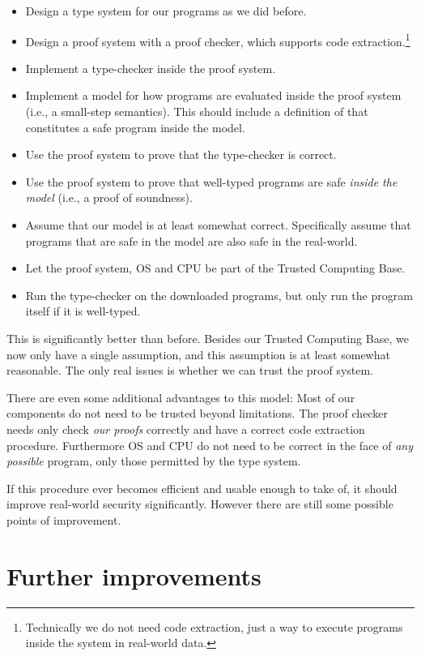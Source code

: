 \begin{itemize}
\item Design a type system for our programs as we did before.
\item Design a proof system with a proof checker, which supports code
  extraction.\footnote{Technically we do not need code extraction, just a way to
    execute programs inside the system in real-world data.}
\item Implement a type-checker inside the proof system.
\item Implement a model for how programs are evaluated inside the proof system
  (i.e., a small-step semantics). This should include a definition of that
  constitutes a safe program inside the model.
\item Use the proof system to prove that the type-checker is correct.
\item Use the proof system to prove that well-typed programs are safe
  \emph{inside the model} (i.e., a proof of soundness).
\item Assume that our model is at least somewhat correct. Specifically assume
  that programs that are safe in the model are also safe in the real-world.
\item Let the proof system, OS and CPU be part of the Trusted Computing Base.
\item Run the type-checker on the downloaded programs, but only run the program
  itself if it is well-typed.
\end{itemize}

This is significantly better than before. Besides our Trusted Computing Base, we
now only have a single assumption, and this assumption is at least somewhat
reasonable. The only real issues is whether we can trust the proof
system.

There are even some additional advantages to this model: Most of our components
do not need to be trusted beyond limitations. The proof checker needs only check
\emph{our proofs} correctly and have a correct code extraction
procedure. Furthermore OS and CPU do not need to be correct in the face of
\emph{any possible} program, only those permitted by the type system.

If this procedure ever becomes efficient and usable enough to take of, it should
improve real-world security significantly. However there are still some possible
points of improvement.

\section{Further improvements}

